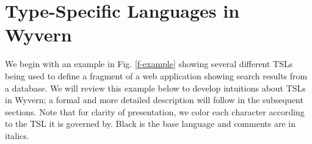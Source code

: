 \section{Type-Specific Languages in Wyvern}
\label{s:motivation}
We begin with an example in Fig. \ref{f-example} showing several different TSLs being used to define a fragment of a web application showing search results from a database. We will review this example below to develop intuitions about TSLs in Wyvern; a formal and more detailed description will follow in the subsequent sections. Note that for clarity of presentation, we color each character  according to the TSL it is governed by. Black is the base language and comments are in italics.

